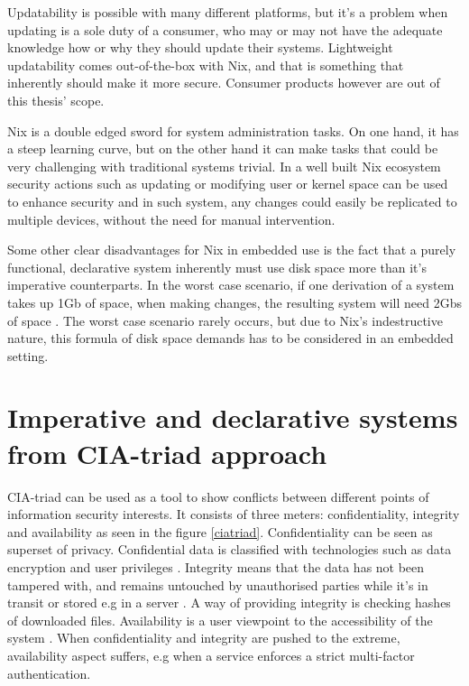 Updatability is possible with many different platforms, but it's a
problem when updating is a sole duty of a consumer, who may or may not
have the adequate knowledge how or why they should update their
systems. Lightweight updatability comes out-of-the-box with Nix, and
that is something that inherently should make it more secure. Consumer
products however are out of this thesis' scope.

Nix is a double edged sword for system administration tasks. On one
hand, it has a steep learning curve, but on the other hand it can make
tasks that could be very challenging with traditional systems
trivial. In a well built Nix ecosystem security actions such as
updating or modifying user or kernel space can be used to enhance
security and in such system, any changes could easily be replicated to
multiple devices, without the need for manual intervention.

Some other clear disadvantages for Nix in embedded use is the fact
that a purely functional, declarative system inherently must use disk
space more than it's imperative counterparts. In the worst case
scenario, if one derivation of a system takes up 1Gb of space, when
making changes, the resulting system will need 2Gbs of space \cite{dolstra2007purely}. The
worst case scenario rarely occurs, but due to Nix's indestructive
nature, this formula of disk space demands has to be considered in an
embedded setting. 

\section{Imperative and declarative systems from CIA-triad approach} \label{imperativeanddeclarative}

CIA-triad can be used as a tool to show conflicts between different
points of information security interests. It consists of three meters:
confidentiality, integrity and availability as seen in the figure
\ref{ciatriad}. Confidentiality can be seen as superset of
privacy. Confidential data is classified with technologies such as
data encryption and user privileges \cite{pender2019parkerian}. Integrity means that the data has
not been tampered with, and remains untouched by unauthorised parties
while it's in transit or stored e.g in a server \cite{pender2019parkerian}. A way of providing
integrity is checking hashes of downloaded files. Availability is a
user viewpoint to the accessibility of the system \cite{pender2019parkerian}. When
confidentiality and integrity are pushed to the extreme, availability
aspect suffers, e.g when a service enforces a strict multi-factor
authentication. 

